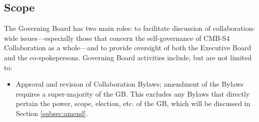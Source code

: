 \documentclass[12pt]{article}
\begin{document}
\subsection{Scope}
The Governing Board has two main roles: to facilitate discussion of collaboration-wide issues---especially those that concern the self-governance of CMB-S4 Collaboration as a whole---and to provide oversight of both the Executive Board and the co-spokepersons.
Governing Board activities include, but are not limited to: 

\begin{itemize}
\item Approval and revision of Collaboration Bylaws; amendment of the Bylaws requires a super-majority of the GB. This excludes any Bylaws that directly pertain the power, scope, election, etc. of the GB, which will be discussed in Section \ref{subsec:amend}.


\end{itemize}
\end{document}
